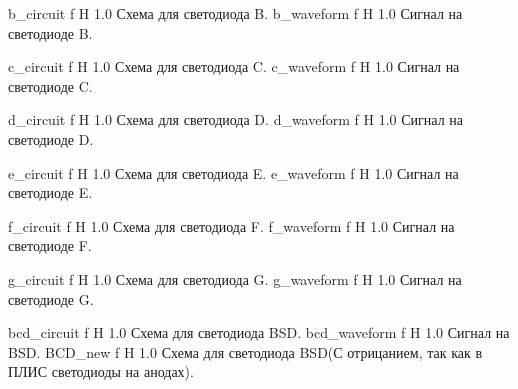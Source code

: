 \documentclass{bmstu}
\begin{document}
	{b_circuit}
	{f} %
	{H} %
	{1.0\textwidth} %
	{Схема для светодиода B.} %
	{b_waveform}
	{f} %
	{H} %
	{1.0\textwidth} %
	{Сигнал на светодиоде B.} %
	
	{c_circuit}
	{f} %
	{H} %
	{1.0\textwidth} %
	{Схема для светодиода C.} %
	{c_waveform}
	{f} %
	{H} %
	{1.0\textwidth} %
	{Сигнал на светодиоде C.} %
	
	{d_circuit}
	{f} %
	{H} %
	{1.0\textwidth} %
	{Схема для светодиода D.} %
	{d_waveform}
	{f} %
	{H} %
	{1.0\textwidth} %
	{Сигнал на светодиоде D.} %
	
	{e_circuit}
	{f} %
	{H} %
	{1.0\textwidth} %
	{Схема для светодиода E.} %
	{e_waveform}
	{f} %
	{H} %
	{1.0\textwidth} %
	{Сигнал на светодиоде E.} %
	
	{f_circuit}
	{f} %
	{H} %
	{1.0\textwidth} %
	{Схема для светодиода F.} %
	{f_waveform}
	{f} %
	{H} %
	{1.0\textwidth} %
	{Сигнал на светодиоде F.} %
	
	{g_circuit}
	{f} %
	{H} %
	{1.0\textwidth} %
	{Схема для светодиода G.} %
	{g_waveform}
	{f} %
	{H} %
	{1.0\textwidth} %
	{Сигнал на светодиоде G.} %
	
	{bcd_circuit}
	{f} %
	{H} %
	{1.0\textwidth} %
	{Схема для светодиода BSD.} %
	{bcd_waveform}
	{f} %
	{H} %
	{1.0\textwidth} %
	{Сигнал на BSD.} %
	{BCD_new}
	{f} %
	{H} %
	{1.0\textwidth} %
	{Схема для светодиода BSD(С отрицанием, так как в ПЛИС светодиоды на анодах).} %
\end{document}
